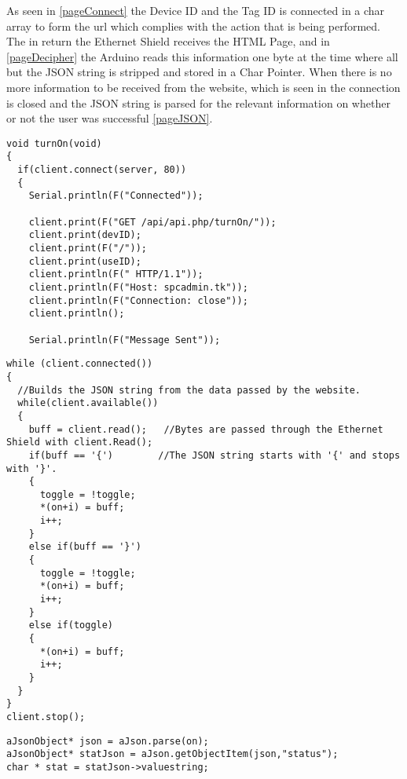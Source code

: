 As seen in \autoref{pageConnect} the Device ID and the Tag ID is connected in a char array to form the url which complies with the action that is being performed. 
The in return the Ethernet Shield receives the HTML Page, and in \autoref{pageDecipher} the Arduino reads this information one byte at the time where all but the JSON string is stripped and stored in a Char Pointer.
When there is no more information to be received from the website, which is seen in  the connection is closed and the JSON string is parsed for the relevant information on whether or not the user was successful \autoref{pageJSON}.
\begin{lstlisting}[frame=single, label=pageConnect, caption=Connecting to the Server and creating an HTML request.]
void turnOn(void)
{
  if(client.connect(server, 80))
  {
    Serial.println(F("Connected")); 

    client.print(F("GET /api/api.php/turnOn/"));
    client.print(devID);
    client.print(F("/"));
    client.print(useID);
    client.println(F(" HTTP/1.1"));
    client.println(F("Host: spcadmin.tk"));
    client.println(F("Connection: close"));
    client.println();
    
    Serial.println(F("Message Sent"));
\end{lstlisting}

\begin{lstlisting}[frame=single, label=pageDecipher, caption=Removing all but the important information from the website.]
while (client.connected())
{
  //Builds the JSON string from the data passed by the website.
  while(client.available()) 
  { 
    buff = client.read();   //Bytes are passed through the Ethernet Shield with client.Read();
    if(buff == '{')        //The JSON string starts with '{' and stops with '}'.
    {
      toggle = !toggle;
      *(on+i) = buff;
      i++;
    }
    else if(buff == '}')
    {
      toggle = !toggle;
      *(on+i) = buff;
      i++;
    }
    else if(toggle)
    {
      *(on+i) = buff;
      i++;
    }
  }
}
client.stop();
\end{lstlisting}

\begin{lstlisting}[frame=single, label=pageJSON, caption=The JSON Code Getting a value with a Token.]
aJsonObject* json = aJson.parse(on);
aJsonObject* statJson = aJson.getObjectItem(json,"status");
char * stat = statJson->valuestring;
\end{lstlisting}